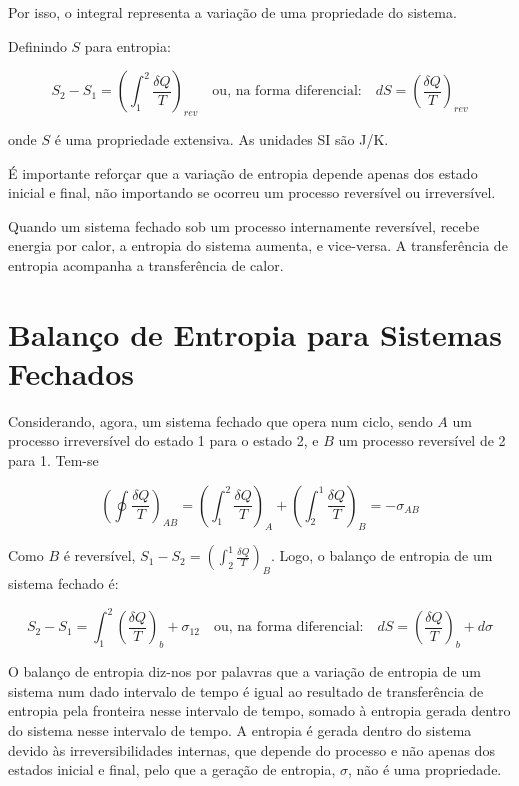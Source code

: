 Por isso, o integral representa a variação de uma propriedade do sistema.

Definindo $S$ para entropia:

\begin{equation} \label{eq:def-entropia-rev}
    S_2 - S_1 = \left( \int_1^2 \frac{\delta Q}{T} \right)_{rev} \quad \text{ou, na forma diferencial:} \quad dS = \left( \frac{\delta Q}{T} \right)_{rev}
\end{equation}

onde $S$ é uma propriedade extensiva. As unidades SI são J/K.

É importante reforçar que a variação de entropia depende apenas dos estado inicial e final, não importando se ocorreu um processo reversível ou irreversível.

Quando um sistema fechado sob um processo internamente reversível, recebe energia por calor, a entropia do sistema aumenta, e vice-versa. A transferência de entropia acompanha a transferência de calor.

\section{Balanço de Entropia para Sistemas Fechados}

Considerando, agora, um sistema fechado que opera num ciclo, sendo $A$ um processo irreversível do estado 1 para o estado 2, e $B$ um processo reversível de 2 para 1. Tem-se

\begin{equation*}
    \left( \oint \frac{\delta Q}{T} \right)_{AB} = \left( \int_1^2 \frac{\delta Q}{T} \right)_A + \left( \int_2^1 \frac{\delta Q}{T} \right)_B =  - \sigma_{AB} 
\end{equation*}

Como $B$ é reversível, $S_1 - S_2 = \left( \int_2^1 \frac{\delta Q}{T} \right)_B$. Logo, o balanço de entropia de um sistema fechado é:

\begin{equation}
    S_2 - S_1 = \int_1^2 \left( \frac{\delta Q}{T} \right)_b + \sigma_{12} \quad \text{ou, na forma diferencial:} \quad dS = \left( \frac{\delta Q}{T}  \right)_b + d\sigma
\end{equation}

O balanço de entropia diz-nos por palavras que a variação de entropia de um sistema num dado intervalo de tempo é igual ao resultado de transferência de entropia pela fronteira nesse intervalo de tempo, somado à entropia gerada dentro do sistema nesse intervalo de tempo.
A entropia é gerada dentro do sistema devido às irreversibilidades internas, que depende do processo e não apenas dos estados inicial e final, pelo que a geração de entropia, $\sigma$, não é uma propriedade.

